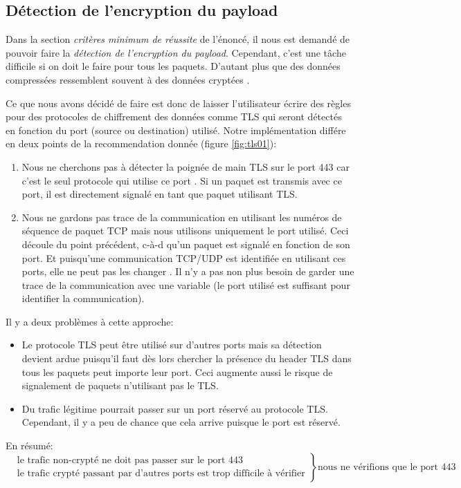 \documentclass[a4paper]{article}
\begin{document}
\subsection{Détection de l’encryption du payload}



Dans la section \textit{critères minimum de réussite} de l'énoncé, il nous est demandé de pouvoir faire la \textit{détection de l'encryption du payload}. Cependant, c'est une tâche difficile si on doit le faire pour tous les paquets. D'autant plus que des données compressées ressemblent souvent à des données cryptées \cite{3}.

Ce que nous avons décidé de faire est donc de laisser l'utilisateur écrire des règles pour des protocoles de chiffrement des données comme TLS qui seront détectés en fonction du port (source ou destination) utilisé. Notre implémentation différe en deux points de la recommendation donnée (figure \ref{fig:tls01}):
\begin{enumerate}
    \item Nous ne cherchons pas à détecter la poignée de main TLS sur le port 443 car c'est le seul protocole qui utilise ce port \cite{5}. Si un paquet est transmis avec ce port, il est directement signalé en tant que paquet utilisant TLS.
    \item Nous ne gardons pas trace de la communication en utilisant les numéros de séquence de paquet TCP mais nous utilisons uniquement le port utilisé. Ceci découle du point précédent, c-à-d qu'un paquet est signalé en fonction de son port. Et puisqu'une communication TCP/UDP est identifiée en utilisant ces ports, elle ne peut pas les changer \cite{4}. Il n'y a pas non plus besoin de garder une trace de la communication avec une variable (le port utilisé est suffisant pour identifier la communication).
\end{enumerate}
Il y a deux problèmes à cette approche:
\begin{itemize}
    \item Le protocole TLS peut être utilisé sur d'autres ports mais sa détection devient ardue puisqu'il faut dès lors chercher la présence du header TLS dans tous les paquets peut importe leur port. Ceci augmente aussi le risque de signalement de paquets n'utilisant pas le TLS.
    \item Du trafic légitime pourrait passer sur un port réservé au protocole TLS. Cependant, il y a peu de chance que cela arrive puisque le port est réservé.
\end{itemize}
En résumé:
\[
    \left.\begin{aligned}
        &\text{le trafic non-crypté ne doit pas passer sur le port 443}\\
        &\text{le trafic crypté passant par d'autres ports est trop difficile à vérifier}
    \end{aligned}\right\} \text{nous ne vérifions que le port 443}
\]
\end{document}
